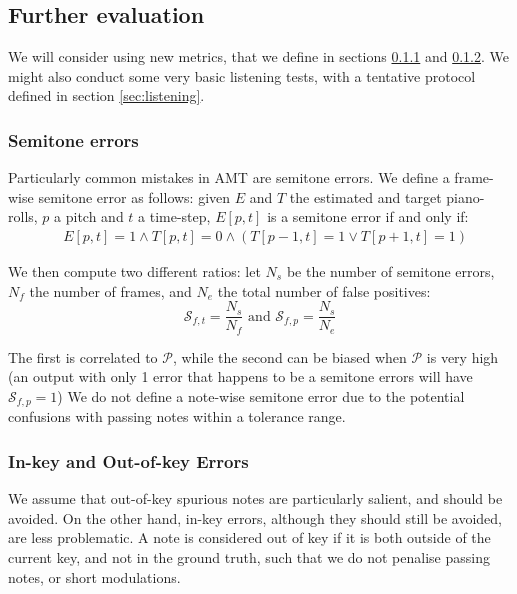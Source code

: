 \documentclass{article}
\begin{document}
\subsection{Further evaluation}

We will consider using new metrics, that we define in sections \ref{sec:semitone} and \ref{sec:outkey}.
We might also conduct some very basic listening tests, with a tentative protocol defined in section \ref{sec:listening}.
 
\subsubsection{Semitone errors}
\label{sec:semitone} 


Particularly common mistakes in AMT are semitone errors.
We define a frame-wise semitone error as follows: given $E$ and $T$ the estimated and target piano-rolls, $p$ a pitch and $t$ a time-step, $E[p,t]$ is a semitone error if and only if: 
\vspace{-0.2cm}
\begin{align*}
&E[p,t]= 1 \wedge T[p,t]= 0 \wedge
(T[p-1,t]= 1 \vee T[p+1,t]= 1)
\end{align*}

\vspace{-0.2cm}
We then compute two different ratios: let $N_s$ be the number of semitone errors, $N_f$ the number of frames, and $N_e$ the total number of false positives:
\vspace{-0.2cm}
\[
\mathcal{S}_{f,t} = \frac{N_s}{N_f} \textrm{ and } \mathcal{S}_{f,p} = \frac{N_s}{N_e}
\]

\vspace{-0.2cm}
The first is correlated to $\mathcal{P}$, while the second can be biased when $\mathcal{P}$ is very high (an output with only 1 error that happens to be a semitone errors will have $\mathcal{S}_{f,p}=1$)
%
We do not define a note-wise semitone error due to the potential confusions with passing notes within a tolerance range.

\subsubsection{In-key and Out-of-key Errors}
\label{sec:outkey}

We assume that out-of-key spurious notes are particularly salient, and should be avoided. On the other hand, in-key errors, although they should still be avoided, are less problematic. A note is considered out of key if it is both outside of the current key, and not in the ground truth, such that we do not penalise passing notes, or short modulations.
\end{document}
